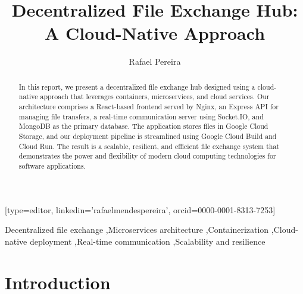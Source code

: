 \documentclass[a4paper,fleqn]{cas-dc}
\begin{document}
\let\WriteBookmarks\relax
\def\floatpagepagefraction{1}
\def\textpagefraction{.001}


\title [mode = title]{Decentralized File Exchange Hub: A Cloud-Native Approach}                     


\author[1]{Rafael Pereira}[type=editor,
                        linkedin='rafaelmendespereira',
                        orcid=0000-0001-8313-7253]
   
\address[1]{Computer Science and Communications Research Centre, School of Technology and Management, Polytechnic of Leiria, 2411-901 Leiria, Portugal}

\begin{abstract}

In this report, we present a decentralized file exchange hub designed using a cloud-native approach that leverages containers, microservices, and cloud services. Our architecture comprises a React-based frontend served by Nginx, an Express API for managing file transfers, a real-time communication server using Socket.IO, and MongoDB as the primary database. The application stores files in Google Cloud Storage, and our deployment pipeline is streamlined using Google Cloud Build and Cloud Run. The result is a scalable, resilient, and efficient file exchange system that demonstrates the power and flexibility of modern cloud computing technologies for software applications.

\end{abstract}

\begin{keywords}
Decentralized file exchange \sep Microservices architecture \sep Containerization \sep Cloud-native deployment \sep Real-time communication \sep Scalability and resilience
\end{keywords}


\maketitle

\section{Introduction}
\end{document}
